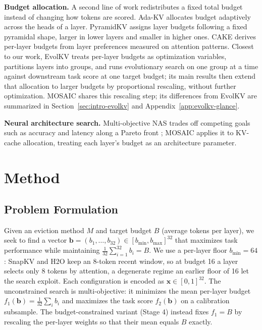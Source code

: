 \documentclass[11pt]{article}
\begin{document}
\textbf{Budget allocation.} A second line of work redistributes a fixed total budget instead of changing how tokens are scored. Ada-KV \citep{feng2025adakv} allocates budget adaptively across the heads of a layer. PyramidKV \citep{cai2025pyramidkv} assigns layer budgets following a fixed pyramidal shape, larger in lower layers and smaller in higher ones. CAKE \citep{qin2025cake} derives per-layer budgets from layer preferences measured on attention patterns. Closest to our work, EvolKV \citep{yu2025evolkv} treats per-layer budgets as optimization variables, partitions layers into groups, and runs evolutionary search on one group at a time against downstream task score at one target budget; its main results then extend that allocation to larger budgets by proportional rescaling, without further optimization. MOSAIC shares this rescaling step; its differences from EvolKV are summarized in Section~\ref{sec:intro-evolkv} and Appendix~\ref{app:evolkv-glance}.

\textbf{Neural architecture search.} Multi-objective NAS trades off competing goals such as accuracy and latency along a Pareto front \citep{elsken2018neural}; MOSAIC applies it to KV-cache allocation, treating each layer's budget as an architecture parameter.

\section{Method}

\subsection{Problem Formulation}

Given an eviction method $M$ and target budget $B$ (average tokens per layer), we seek to find a vector $\mathbf{b} = (b_1, \ldots, b_{32}) \in [b_{\min}, b_{\max}]^{32}$ that maximizes task performance while maintaining $\frac{1}{32}\sum_{i=1}^{32} b_i = B$. We use a per-layer floor $b_{\min} = 64$: SnapKV and H2O keep an 8-token recent window, so at budget 16 a layer selects only 8 tokens by attention, a degenerate regime an earlier floor of 16 let the search exploit. Each configuration is encoded as $\mathbf{x} \in [0,1]^{32}$. The unconstrained search is multi-objective: it minimizes the mean per-layer budget $f_1(\mathbf{b}) = \frac{1}{32}\sum_i b_i$ and maximizes the task score $f_2(\mathbf{b})$ on a calibration subsample. The budget-constrained variant (Stage 4) instead fixes $f_1 = B$ by rescaling the per-layer weights so that their mean equals $B$ exactly.
\end{document}
